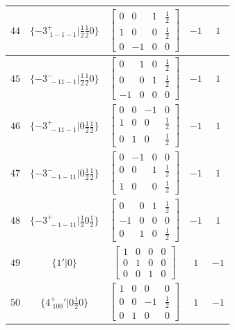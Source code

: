\documentclass[fleqn,8pt]{jsarticle}
\begin{document}
\begin{longtable}{ccccc}
$ 44 $ & $ \{-3^{+}_{\,\,1-1-1}|\frac{1}{2} \frac{1}{2} 0\} $ & $ \begin{bmatrix} 0 & 0 & 1 & \frac{1}{2} \\ 1 & 0 & 0 & \frac{1}{2} \\ 0 & -1 & 0 & 0 \end{bmatrix} $ & $ -1 $ & $ 1 $ \\ \hline
$ 45 $ & $ \{-3^{-}_{\,\,-11-1}|\frac{1}{2} \frac{1}{2} 0\} $ & $ \begin{bmatrix} 0 & 1 & 0 & \frac{1}{2} \\ 0 & 0 & 1 & \frac{1}{2} \\ -1 & 0 & 0 & 0 \end{bmatrix} $ & $ -1 $ & $ 1 $ \\ \hline
$ 46 $ & $ \{-3^{+}_{\,\,-11-1}|0 \frac{1}{2} \frac{1}{2}\} $ & $ \begin{bmatrix} 0 & 0 & -1 & 0 \\ 1 & 0 & 0 & \frac{1}{2} \\ 0 & 1 & 0 & \frac{1}{2} \end{bmatrix} $ & $ -1 $ & $ 1 $ \\ \hline
$ 47 $ & $ \{-3^{-}_{\,\,-1-11}|0 \frac{1}{2} \frac{1}{2}\} $ & $ \begin{bmatrix} 0 & -1 & 0 & 0 \\ 0 & 0 & 1 & \frac{1}{2} \\ 1 & 0 & 0 & \frac{1}{2} \end{bmatrix} $ & $ -1 $ & $ 1 $ \\ \hline
$ 48 $ & $ \{-3^{+}_{\,\,-1-11}|\frac{1}{2} 0 \frac{1}{2}\} $ & $ \begin{bmatrix} 0 & 0 & 1 & \frac{1}{2} \\ -1 & 0 & 0 & 0 \\ 0 & 1 & 0 & \frac{1}{2} \end{bmatrix} $ & $ -1 $ & $ 1 $ \\ \hline
$ 49 $ & $ \{1{}'|0\} $ & $ \begin{bmatrix} 1 & 0 & 0 & 0 \\ 0 & 1 & 0 & 0 \\ 0 & 0 & 1 & 0 \end{bmatrix} $ & $ 1 $ & $ -1 $ \\ \hline
$ 50 $ & $ \{4^{+}_{\,\,100}{}'|0 \frac{1}{2} 0\} $ & $ \begin{bmatrix} 1 & 0 & 0 & 0 \\ 0 & 0 & -1 & \frac{1}{2} \\ 0 & 1 & 0 & 0 \end{bmatrix} $ & $ 1 $ & $ -1 $ \\ \hline

\end{longtable}
\end{document}
